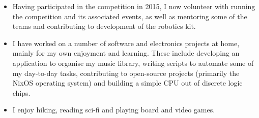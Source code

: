 
\begin{itemize}
  \item Having participated in the \studentrobotics{} competition in 2015, I now volunteer with running the competition and its associated events, as well as mentoring some of the teams and contributing to development of the robotics kit.
  \item I have worked on a number of software and electronics projects at home, mainly for my own enjoyment and learning. These include developing an application to organise my music library, writing scripts to automate some of my day-to-day tasks, contributing to open-source projects (primarily the NixOS operating system) and building a simple CPU out of discrete logic chips.
  \item I enjoy hiking, reading sci-fi and playing board and video games.
\end{itemize}
